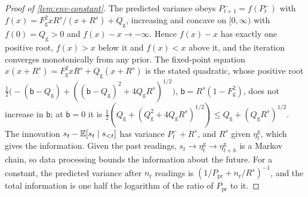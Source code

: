\begin{proof}[Proof of \cref{lem:env-constant}]
The predicted variance obeys $P^-_{t+1}=f(P^-_t)$ with $f(x)=F_{\mathrm g}^2xR^s/(x+R^s)+Q_{\mathrm g}$, increasing and concave on $[0,\infty)$ with $f(0)=Q_{\mathrm g}>0$ and $f(x)-x\to-\infty$. Hence $f(x)-x$ has exactly one positive root, $f(x)>x$ below it and $f(x)<x$ above it, and the iteration converges monotonically from any prior. The fixed-point equation $x(x+R^s)=F_{\mathrm g}^2xR^s+Q_{\mathrm g}(x+R^s)$ is the stated quadratic, whose positive root $\frac12\bigl(-(\mathsf b-Q_{\mathrm g})+((\mathsf b-Q_{\mathrm g})^2+4Q_{\mathrm g}R^s)^{1/2}\bigr)$, $\mathsf b=R^s(1-F_{\mathrm g}^2)$, does not increase in $\mathsf b$; at $\mathsf b=0$ it is $\frac12(Q_{\mathrm g}+(Q_{\mathrm g}^2+4Q_{\mathrm g}R^s)^{1/2})\le Q_{\mathrm g}+(Q_{\mathrm g}R^s)^{1/2}$. The innovation $s_t-\mathbb{E}[s_t\mid s_{<t}]$ has variance $P^-_t+R^s$, and $R^s$ given $\eta^{\mathrm g}_t$, which gives the information. Given the past readings, $s_t\to\eta^{\mathrm g}_t\to\eta^{\mathrm g}_{t+h}$ is a Markov chain, so data processing bounds the information about the future. For a constant, the predicted variance after $n_{\mathrm r}$ readings is $(1/P_{\mathrm{pr}}+n_{\mathrm r}/R^s)^{-1}$, and the total information is one half the logarithm of the ratio of $P_{\mathrm{pr}}$ to it.
\end{proof}

